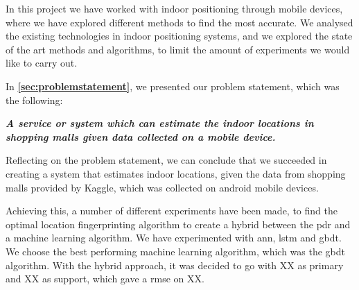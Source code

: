 In this project we have worked with indoor positioning through mobile devices, where we have explored different methods to find the most accurate. We analysed the existing technologies in indoor positioning systems, and we explored the state of the art methods and algorithms, to limit the amount of experiments we would like to carry out. 

In \textbf{\autoref{sec:problemstatement}}, we presented our problem statement, which was the following: 

\begin{center}
    \textbf{\textit{A service or system which can estimate the indoor locations in shopping malls given data collected on a mobile device.}}
\end{center}

Reflecting on the problem statement, we can conclude that we succeeded in creating a system that estimates indoor locations, given the data from shopping malls provided by Kaggle, which was collected on android mobile devices. 

Achieving this, a number of different experiments have been made, to find the optimal location fingerprinting algorithm to create a hybrid between the \acrlong{pdr} and a machine learning algorithm. We have experimented with \acrlong{ann}, \acrlong{lstm} and \acrlong{gbdt}. We choose the best performing machine learning algorithm, which was the \gls{gbdt} algorithm. 
With the hybrid approach, it was decided to go with XX as primary and XX as support, which gave a \acrlong{rmse} on XX. 
